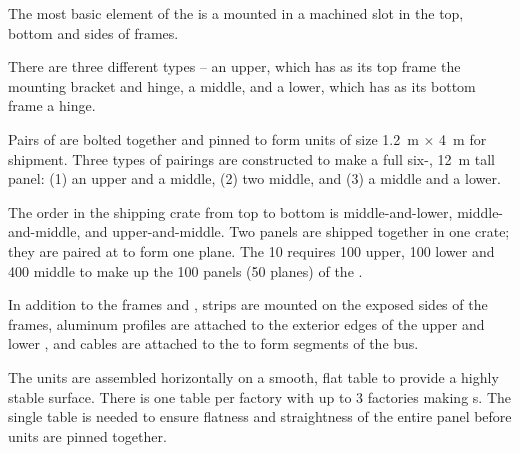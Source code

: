 The most basic element of the  
is a  mounted in a machined slot in the top, bottom and sides of \frfour frames.  



There are three different  types  -- an upper, which has as its top frame the  mounting bracket and  hinge, a middle, and a lower, which has as its bottom frame a  hinge.  

Pairs of  are bolted together and pinned to form  units of size \SI{1.2}{\m} $\times$ \SI{4}{\m} for shipment. Three types of pairings are constructed to make a full six-, \SI{12}{\m} tall  panel: (1) an upper and a middle, (2) two middle, and (3) a middle and a lower.

The order in the shipping crate from top to bottom is middle-and-lower, middle-and-middle, and upper-and-middle.   Two  panels are shipped together in one crate; they are paired at \surf to form one  plane.  The \SI{10}{\kt}  requires 100 upper, 100 lower and 400 middle  to make up the 100  panels (50  planes) of the .

In addition to the frames and , 
 strips are mounted on the exposed sides of the \frfour frames, aluminum profiles are attached to the exterior edges of the upper and lower , 
and cables are attached to the  to form segments of the  bus.  

The  units are assembled horizontally on a smooth, flat table to provide a highly stable surface. There is one table per factory with up to 3 factories making s. The single table is needed to ensure flatness and straightness of the entire panel before units are pinned together.


